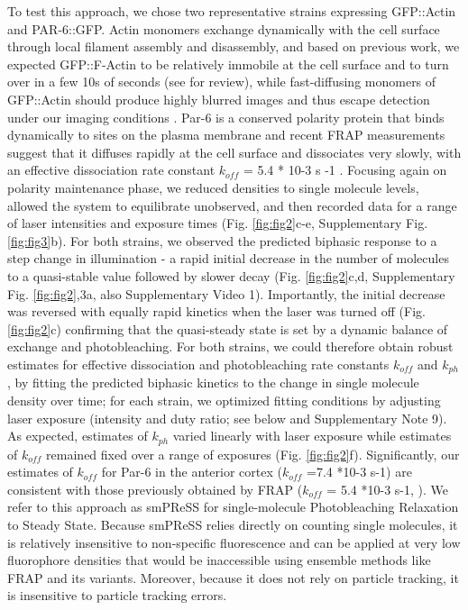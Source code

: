  
 
 
 
 To test this approach, we chose two representative strains expressing GFP::Actin and PAR-6::GFP. Actin monomers exchange dynamically with the cell surface through local filament assembly and disassembly, and based on previous work, we expected GFP::F-Actin to be relatively immobile at the cell surface and to turn over in a few 10s of seconds (see \cite{nmeth21} for review), while fast-diffusing monomers of GFP::Actin should produce highly blurred images and thus escape detection under our imaging conditions \cite{nmeth6}. Par-6 is a conserved polarity protein that binds dynamically to sites on the plasma membrane \cite{nmeth22,nmeth23,nmeth24} and recent FRAP measurements suggest that it diffuses rapidly at the cell surface and dissociates very slowly, with an effective dissociation rate constant $k_{off}$ = 5.4 * 10-3 s -1 \cite{nmeth25}. Focusing again on polarity maintenance phase, we reduced densities to single molecule levels, allowed the system to equilibrate unobserved, and then recorded data for a range of laser intensities and exposure times (Fig. \ref{fig:fig2}c-e, Supplementary Fig. \ref{fig:fig3}b). For both strains, we observed the predicted biphasic response to a step change in illumination - a rapid initial decrease in the number of molecules to a quasi-stable value followed by slower decay (Fig. \ref{fig:fig2}c,d, Supplementary Fig. \ref{fig:fig2},3a, also Supplementary Video 1). Importantly, the initial decrease was reversed with equally rapid kinetics when the laser was turned off (Fig. \ref{fig:fig2}c) confirming that the quasi-steady state is set by a dynamic balance of exchange and photobleaching. For both strains, we could therefore obtain robust estimates for effective dissociation and photobleaching rate constants $k_{off}$ and $k_{ph}$, by fitting the predicted biphasic kinetics to the change in single molecule density over time; for each strain, we optimized fitting conditions by adjusting laser exposure (intensity and duty ratio; see below and Supplementary Note 9). As expected, estimates of $k_{ph}$ varied linearly with laser exposure while estimates of $k_{off}$ remained fixed over a range of exposures (Fig. \ref{fig:fig2}f). Significantly, our estimates of $k_{off}$ for Par-6 in the anterior cortex ($k_{off}$ =7.4 *10-3 s-1) are consistent with those previously obtained by FRAP ($k_{off}$ = 5.4 *10-3 s-1, \cite{nmeth25}). We refer to this approach as smPReSS for single-molecule Photobleaching Relaxation to Steady State. Because smPReSS relies directly on counting single molecules, it is relatively insensitive to non-specific fluorescence and can be applied at very low fluorophore densities that would be inaccessible using ensemble methods like FRAP and its variants. Moreover, because it does not rely on particle tracking, it is insensitive to particle tracking errors.
 
